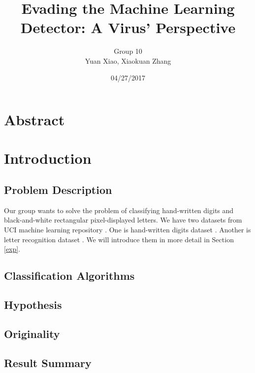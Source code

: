 \documentclass[11pt]{article}
\title{Evading the Machine Learning Detector: A Virus’ Perspective}
\author{Group 10 \\ Yuan Xiao, Xiaokuan Zhang}
\date{04/27/2017}
\begin{document}
\maketitle
\section*{Abstract}


\section{Introduction}

\subsection{Problem Description}
Our group wants to solve the problem of classifying hand-written digits and  black-and-white rectangular pixel-displayed letters. We have two datasets from UCI machine learning repository \cite{Lichman2013}. One is hand-written digits dataset \cite{digitdataset}. Another is letter recognition dataset \cite{letterdataset}. We will introduce them in more detail in Section \ref{exp}.

\subsection{Classification Algorithms}

\subsection{Hypothesis}

\subsection{Originality}

\subsection{Result Summary}
\end{document}
